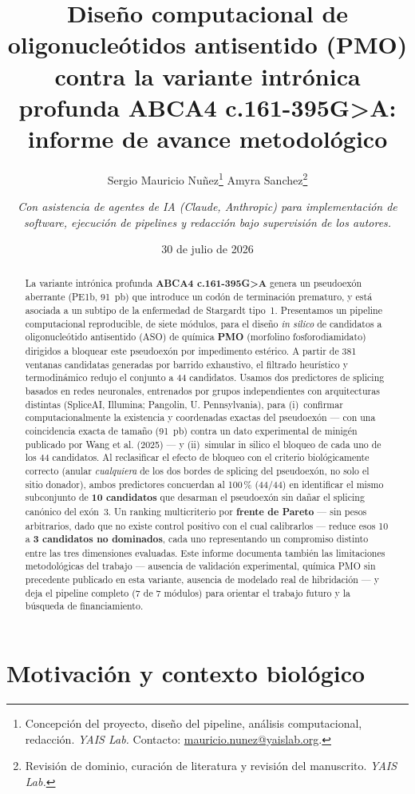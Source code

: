 \documentclass[11pt,a4paper]{article}
\title{\textbf{Diseño computacional de oligonucleótidos antisentido (PMO) contra la variante intrónica profunda ABCA4 c.161-395G>A: informe de avance metodológico}}
\author{
Sergio Mauricio Nuñez\thanks{Concepción del proyecto, diseño del pipeline, análisis computacional, redacción. \newline \textit{YAIS Lab.} Contacto: \href{mailto:mauricio.nunez@yaislab.org}{mauricio.nunez@yaislab.org}.}
\quad
Amyra Sanchez\thanks{Revisión de dominio, curación de literatura y revisión del manuscrito. \newline \textit{YAIS Lab.}}
\and
\textit{Con asistencia de agentes de IA (Claude, Anthropic) para implementación de software, ejecución de pipelines y redacción bajo supervisión de los autores.}
}
\date{30 de julio de 2026}
\begin{document}
\maketitle

\begin{abstract}
\noindent
La variante intrónica profunda \textbf{ABCA4 c.161-395G>A} genera un pseudoexón aberrante (PE1b, 91~pb) que introduce un codón de terminación prematuro, y está asociada a un subtipo de la enfermedad de Stargardt tipo~1. Presentamos un pipeline computacional reproducible, de siete módulos, para el diseño \emph{in silico} de candidatos a oligonucleótido antisentido (ASO) de química \textbf{PMO} (morfolino fosforodiamidato) dirigidos a bloquear este pseudoexón por impedimento estérico. A partir de 381 ventanas candidatas generadas por barrido exhaustivo, el filtrado heurístico y termodinámico redujo el conjunto a 44 candidatos. Usamos dos predictores de splicing basados en redes neuronales, entrenados por grupos independientes con arquitecturas distintas (SpliceAI, Illumina; Pangolin, U. Pennsylvania), para (i)~confirmar computacionalmente la existencia y coordenadas exactas del pseudoexón --- con una coincidencia exacta de tamaño (91~pb) contra un dato experimental de minigén publicado por Wang et al. (2025) --- y (ii)~simular in silico el bloqueo de cada uno de los 44 candidatos. Al reclasificar el efecto de bloqueo con el criterio biológicamente correcto (anular \emph{cualquiera} de los dos bordes de splicing del pseudoexón, no solo el sitio donador), ambos predictores concuerdan al 100\,\% (44/44) en identificar el mismo subconjunto de \textbf{10 candidatos} que desarman el pseudoexón sin dañar el splicing canónico del exón~3. Un ranking multicriterio por \textbf{frente de Pareto} --- sin pesos arbitrarios, dado que no existe control positivo con el cual calibrarlos --- reduce esos 10 a \textbf{3 candidatos no dominados}, cada uno representando un compromiso distinto entre las tres dimensiones evaluadas. Este informe documenta también las limitaciones metodológicas del trabajo --- ausencia de validación experimental, química PMO sin precedente publicado en esta variante, ausencia de modelado real de hibridación --- y deja el pipeline completo (7 de 7 módulos) para orientar el trabajo futuro y la búsqueda de financiamiento.
\end{abstract}

\tableofcontents

\section{Motivación y contexto biológico}
\end{document}
